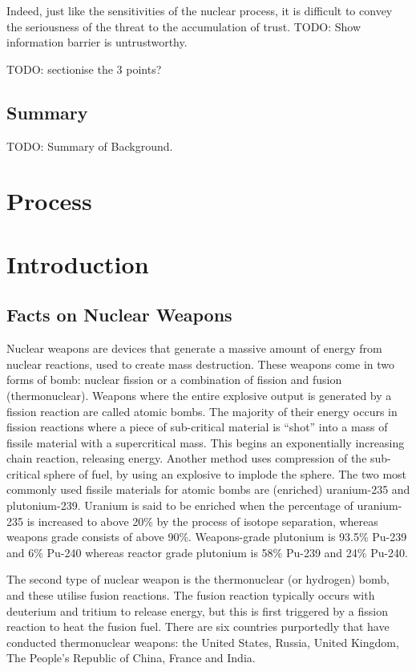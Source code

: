 \documentclass[twoside,titlepage,11pt,twocolumn,a4paper]{article}
\begin{document}
Indeed, just like the sensitivities of the nuclear process, it is
difficult to convey the seriousness of the threat to the accumulation
of trust. TODO: Show information barrier is untrustworthy.

TODO: sectionise the 3 points?
\subsection{Summary}
TODO: Summary of Background.

\section{Process}

\section{Introduction}

\subsection{Facts on Nuclear Weapons}
Nuclear weapons are devices that generate a massive amount of energy
from nuclear reactions, used to create mass destruction. These weapons
come in two forms of bomb: nuclear fission or a combination of fission
and fusion (thermonuclear). Weapons where the entire explosive output
is generated by a fission reaction are called atomic bombs. The
majority of their energy occurs in fission reactions where a piece of
sub-critical material is ``shot'' into a mass of fissile material with
a supercritical mass. This begins an exponentially increasing chain
reaction, releasing energy. Another method uses compression of the
sub-critical sphere of fuel, by using an explosive to implode the
sphere. The two most commonly used fissile materials for atomic bombs
are (enriched) uranium-235 and plutonium-239. Uranium is said to be
enriched when the percentage of uranium-235 is increased to above 20\%
by the process of isotope separation, whereas weapons grade consists
of above 90\%. \citep{blackmarket} Weapons-grade plutonium is 93.5\%
Pu-239 and 6\% Pu-240 whereas reactor grade plutonium is 58\% Pu-239
and 24\% Pu-240.  \citep{drell1993}

The second type of nuclear weapon is the thermonuclear (or hydrogen)
bomb, and these utilise fusion reactions.  The fusion reaction
typically occurs with deuterium and tritium to release energy, but
this is first triggered by a fission reaction to heat the fusion
fuel. There are six countries purportedly that have conducted
thermonuclear weapons: the United States, Russia, United Kingdom, The
People's Republic of China, France and India.
\end{document}
